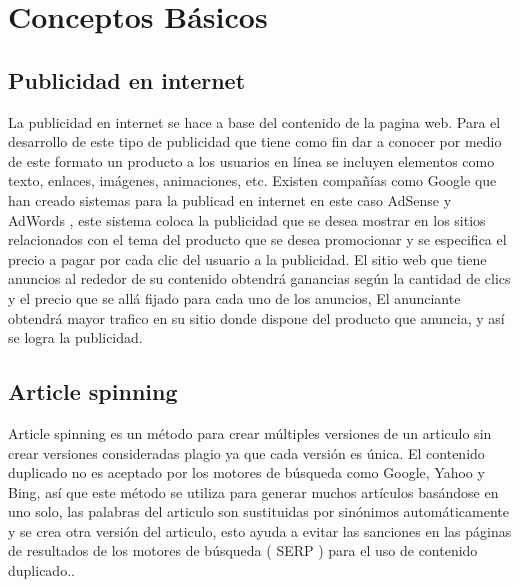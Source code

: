 
\chapter{Conceptos Básicos}

\section{Publicidad en internet}

La publicidad en internet se hace a base del contenido de la pagina web. Para el desarrollo de este tipo de publicidad que tiene como fin dar a conocer por medio de este formato un producto a los usuarios en línea se incluyen elementos como texto, enlaces, imágenes, animaciones, etc. Existen compañías como Google que han creado sistemas para la publicad en internet en este caso AdSense y AdWords \cite{kowaliw2012promoting}, este sistema coloca la publicidad que se desea mostrar en los sitios relacionados con el tema del producto que se desea promocionar y se especifica el precio a pagar por cada clic del usuario a la publicidad. El sitio web que tiene anuncios al rededor de su contenido obtendrá ganancias según la cantidad de clics y el precio que se allá fijado para cada uno de los anuncios, El anunciante obtendrá mayor trafico en su sitio donde dispone del producto que anuncia, y así se logra la publicidad.

\section{Article spinning}

Article spinning es un método para crear múltiples versiones de un articulo sin crear versiones consideradas plagio ya que cada versión es única. El contenido duplicado no es aceptado por los motores de búsqueda como Google, Yahoo y Bing, así que este método se utiliza para generar muchos artículos basándose en uno solo, las palabras del articulo son sustituidas  por sinónimos automáticamente y se crea otra versión del articulo, esto ayuda a evitar las sanciones en las páginas de resultados de los motores de búsqueda ( SERP ) para el uso de contenido duplicado.\cite{takagi2001interactive}.

